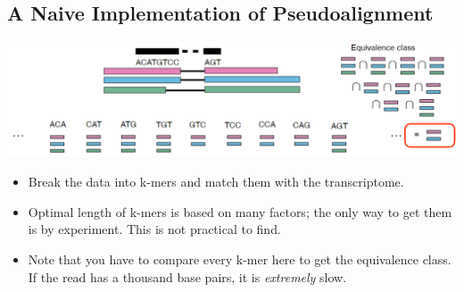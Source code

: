 \documentclass[10pt]{article}
\begin{document}
\subsection*{A Naive Implementation of Pseudoalignment}
\begin{center}
    \includegraphics*[scale=0.8]{W4_6.png}
\end{center}
\begin{itemize}
    \item Break the data into k-mers and match them with the transcriptome.
    \item Optimal length of k-mers is based on many factors; the only way to get them is by experiment.  This is not practical to find.
    \item Note that you have to compare every k-mer here to get the equivalence class.  If the read has a thousand base pairs, it is \textit{extremely} slow.
\end{itemize}
\end{document}
